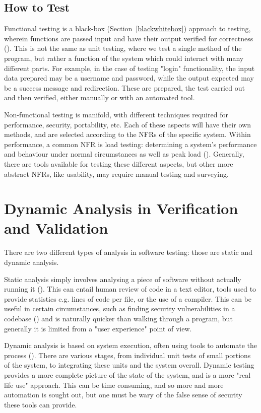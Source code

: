 \documentclass[12pt]{article}
\begin{document}
\subsection{How to Test}

Functional testing is a black-box (Section~\ref{blackwhitebox}) approach to testing, wherein functions are passed input and have their output verified for correctness (). This is not the same as unit testing, where we test a single method of the program, but rather a function of the system which could interact with many different parts. For example, in the case of testing "login" functionality, the input data prepared may be a username and password, while the output expected may be a success message and redirection. These are prepared, the test carried out and then verified, either manually or with an automated tool.

Non-functional testing is manifold, with different techniques required for performance, security, portability, etc. Each of these aspects will have their own methods, and are selected according to the NFRs of the specific system. Within performance, a common NFR is load testing: determining a system's performance and behaviour under normal circumstances as well as peak load (). Generally, there are tools available for testing these different aspects, but other more abstract NFRs, like usability, may require manual testing and surveying.



\section{Dynamic Analysis in Verification and Validation} \label{veri_vali}

There are two different types of analysis in software testing: those are static and dynamic analysis. 

Static analysis simply involves analysing a piece of software without actually running it (). This can entail human review of code in a text editor, tools used to provide statistics e.g. lines of code per file, or the use of a compiler. This can be useful in certain circumstances, such as finding security vulnerabilities in a codebase () and is naturally quicker than walking through a program, but generally it is limited from a "user experience" point of view.

Dynamic analysis is based on system execution, often using tools to automate the process (). There are various stages, from individual unit tests of small portions of the system, to integrating these units and the system overall. Dynamic testing provides a more complete picture of the state of the system, and is a more "real life use" approach. This can be time consuming, and so more and more automation is sought out, but one must be wary of the false sense of security these tools can provide.
\end{document}
